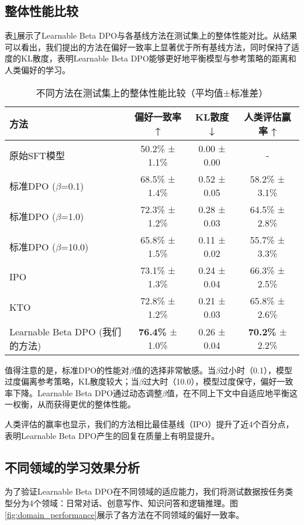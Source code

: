 \subsection{整体性能比较}
表\ref{tab:overall_performance}展示了Learnable Beta DPO与各基线方法在测试集上的整体性能对比。从结果可以看出，我们提出的方法在偏好一致率上显著优于所有基线方法，同时保持了适度的KL散度，表明Learnable Beta DPO能够更好地平衡模型与参考策略的距离和人类偏好的学习。

\begin{table}[h]
\centering
\caption{不同方法在测试集上的整体性能比较（平均值±标准差）}
\label{tab:overall_performance}
\begin{tabular}{lccc}
\toprule
\textbf{方法} & \textbf{偏好一致率} ↑ & \textbf{KL散度} ↓ & \textbf{人类评估赢率} ↑ \\
\midrule
原始SFT模型 & 50.2\% ± 1.1\% & 0.00 ± 0.00 & - \\
\midrule
标准DPO ($\beta$=0.1) & 68.5\% ± 1.4\% & 0.52 ± 0.05 & 58.2\% ± 3.1\% \\
标准DPO ($\beta$=1.0) & 72.3\% ± 1.2\% & 0.28 ± 0.03 & 64.5\% ± 2.8\% \\
标准DPO ($\beta$=10.0) & 65.8\% ± 1.5\% & 0.11 ± 0.02 & 55.7\% ± 3.3\% \\
IPO & 73.1\% ± 1.3\% & 0.24 ± 0.04 & 66.3\% ± 2.5\% \\
KTO & 72.8\% ± 1.2\% & 0.21 ± 0.03 & 65.8\% ± 2.6\% \\
\midrule
Learnable Beta DPO (我们的方法) & \textbf{76.4\%} ± 1.0\% & 0.26 ± 0.04 & \textbf{70.2\%} ± 2.2\% \\
\bottomrule
\end{tabular}
\end{table}

值得注意的是，标准DPO的性能对$\beta$值的选择非常敏感。当$\beta$过小时（0.1），模型过度偏离参考策略，KL散度较大；当$\beta$过大时（10.0），模型过度保守，偏好一致率下降。Learnable Beta DPO通过动态调整$\beta$值，在不同上下文中自适应地平衡这一权衡，从而获得更优的整体性能。

人类评估的赢率也显示，我们的方法相比最佳基线（IPO）提升了近4个百分点，表明Learnable Beta DPO产生的回复在质量上有明显提升。

\subsection{不同领域的学习效果分析}
为了验证Learnable Beta DPO在不同领域的适应能力，我们将测试数据按任务类型分为4个领域：日常对话、创意写作、知识问答和逻辑推理。图\ref{fig:domain_performance}展示了各方法在不同领域的偏好一致率。

